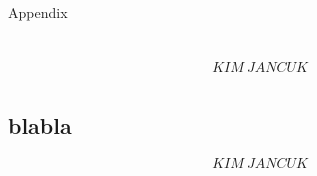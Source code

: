 \begin{titlepage}
	\centering 
	\vspace*{6cm}
	\noindent \Huge{Appendix}
\end{titlepage}
\renewcommand\thechapter{\Alph{chapter}}
\renewcommand\thesection{\thechapter.\arabic{section}}
\renewcommand{\theequation}{\Alph{chapter}.\arabic{equation}}

\chapter{}

\begin{equation}
	KIM~JANCUK
\end{equation}

\chapter{}

\section{blabla}

\begin{equation}
KIM~JANCUK
\end{equation}